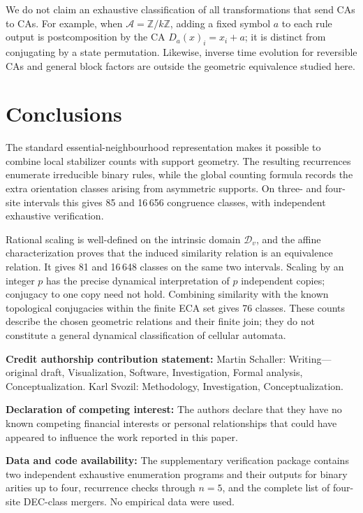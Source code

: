 \documentclass[11pt,a4paper]{article}
\newcommand{\rev}[1]{{\color{blue}#1}}
\newenvironment{revision}{\color{blue}}{}
\newcommand{\rev}[1]{{\color{black}#1}}
\newenvironment{revision}{\color{black}}{}
\begin{document}
\begin{revision}
We do not claim an exhaustive classification of all transformations that
send CAs to CAs. For example, when $\mathcal A=\mathbb Z/k\mathbb Z$,
adding a fixed symbol $a$ to each rule output is postcomposition by the
CA $D_a(x)_i=x_i+a$; it is distinct from conjugating by a state
permutation. Likewise, inverse time evolution for reversible CAs and
general block factors are outside the geometric equivalence studied here.

\section{Conclusions}
\label{sec:sum}
The standard essential-neighbourhood representation makes it possible to
combine local stabilizer counts with support geometry. The resulting
recurrences enumerate irreducible binary rules, while the global counting
formula records the extra orientation classes arising from asymmetric
supports. On three- and four-site intervals this gives 85 and 16\,656
congruence classes, with independent exhaustive verification.

Rational scaling is well-defined on the intrinsic domain
$\mathcal D_v$, and the affine characterization proves that the induced
similarity relation is an equivalence relation. It gives 81 and 16\,648
classes on the same two intervals. Scaling by an integer $p$ has the
precise dynamical interpretation of $p$ independent copies; conjugacy
to one copy need not hold. Combining similarity with the known topological
conjugacies within the finite ECA set gives 76 classes. These counts
describe the chosen geometric relations and their finite join; they do
not constitute a general dynamical classification of cellular automata.
\end{revision}

\textbf{Credit authorship contribution statement:}
Martin Schaller: Writing---original draft, Visualization, Software, Investigation, Formal analysis, Conceptualization. Karl Svozil: Methodology, Investigation, Conceptualization.

\textbf{Declaration of competing interest:}
The authors declare that they have no known competing financial interests or personal relationships that could have appeared to influence the work reported in this paper.

\rev{\textbf{Data and code availability:} The supplementary verification package contains two independent exhaustive enumeration programs and their outputs for binary arities up to four, recurrence checks through $n=5$, and the complete list of four-site DEC-class mergers. No empirical data were used.}
\end{document}
